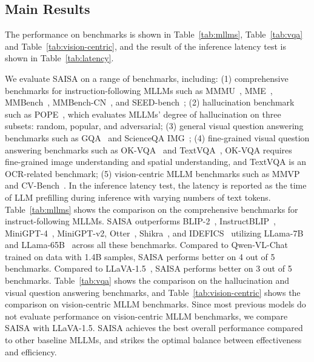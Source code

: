 \subsection{Main Results}
The performance on benchmarks is shown in Table~\ref{tab:mllms}, Table~\ref{tab:vqa} and Table~\ref{tab:vision-centric}, and the result of the inference latency test is shown in Table~\ref{tab:latency}.

We evaluate SAISA on a range of benchmarks, including: (1) comprehensive benchmarks for instruction-following MLLMs such as MMMU~\cite{yue2024mmmumassivemultidisciplinemultimodal}, MME~\cite{fu2024mmecomprehensiveevaluationbenchmark}, MMBench~\cite{liu2024mmbenchmultimodalmodelallaround}, MMBench-CN~\cite{liu2024mmbenchmultimodalmodelallaround}, and SEED-bench~\cite{li2023seedbenchbenchmarkingmultimodalllms}; (2) hallucination benchmark such as POPE~\cite{li2023evaluatingobjecthallucinationlarge}, which evaluates MLLMs' degree of hallucination on three subsets: random, popular, and adversarial; (3) general visual question answering benchmarks such as GQA~\cite{hudson2019gqanewdatasetrealworld} and ScienceQA IMG~\cite{lu2022learnexplainmultimodalreasoning}; (4) fine-grained visual question answering benchmarks such as OK-VQA~\cite{marino2019okvqavisualquestionanswering} and TextVQA~\cite{singh2019vqamodelsread}, OK-VQA requires fine-grained image understanding and spatial understanding, and TextVQA is an OCR-related benchmark; (5) vision-centric MLLM benchmarks such as MMVP~\cite{tong2024eyeswideshutexploring} and CV-Bench~\cite{tong2024cambrian1fullyopenvisioncentric}.
In the inference latency test, the latency is reported as the time of LLM prefilling during inference with varying numbers of text tokens.
Table~\ref{tab:mllms} shows the comparison on the comprehensive benchmarks for instruct-following MLLMs.
SAISA outperforms BLIP-2~\cite{li2023blip2bootstrappinglanguageimagepretraining}, InstructBLIP~\cite{dai2023instructblipgeneralpurposevisionlanguagemodels}, MiniGPT-4~\cite{zhu2023minigpt4enhancingvisionlanguageunderstanding}, MiniGPT-v2\cite{chen2023minigptv2largelanguagemodel}, Otter~\cite{li2023ottermultimodalmodelincontext}, Shikra~\cite{chen2023shikraunleashingmultimodalllms}, and IDEFICS~\cite{idefics} utilizing LLama-7B and LLama-65B~\cite{touvron2023llamaopenefficientfoundation} across all these benchmarks.
Compared to Qwen-VL-Chat~\cite{Qwen-VL} trained on data with 1.4B samples, SAISA performs better on 4 out of 5 benchmarks.
Compared to LLaVA-1.5~\cite{liu2024improvedbaselinesvisualinstruction}, SAISA performs better on 3 out of 5 benchmarks.
Table~\ref{tab:vqa} shows the comparison on the hallucination and visual question answering benchmarks, and Table~\ref{tab:vision-centric} shows the comparison on vision-centric MLLM benchmarks.
Since most previous models do not evaluate performance on vision-centric MLLM benchmarks, we compare SAISA with LLaVA-1.5.
SAISA achieves the best overall performance compared to other baseline MLLMs, and strikes the optimal balance between effectiveness and efficiency.

